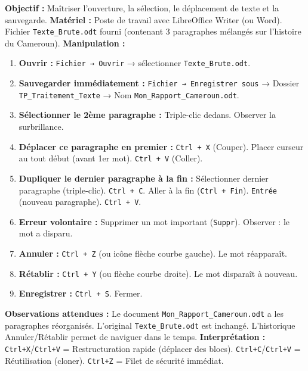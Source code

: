 \documentclass[11pt]{article}
\begin{document}
\begin{experience}
\textbf{Objectif :} Maîtriser l'ouverture, la sélection, le déplacement de texte et la sauvegarde.
\textbf{Matériel :} Poste de travail avec LibreOffice Writer (ou Word). Fichier \texttt{Texte\_Brute.odt} fourni (contenant 3 paragraphes mélangés sur l'histoire du Cameroun).
\textbf{Manipulation :}
\begin{enumerate}
    \item \textbf{Ouvrir :} \texttt{Fichier → Ouvrir} → sélectionner \texttt{Texte\_Brute.odt}.
    \item \textbf{Sauvegarder immédiatement :} \texttt{Fichier → Enregistrer sous} → Dossier \texttt{TP\_Traitement\_Texte} → Nom \texttt{Mon\_Rapport\_Cameroun.odt}.
    \item \textbf{Sélectionner le 2ème paragraphe :} Triple-clic dedans. Observer la surbrillance.
    \item \textbf{Déplacer ce paragraphe en premier :} \texttt{Ctrl + X} (Couper). Placer curseur au tout début (avant 1er mot). \texttt{Ctrl + V} (Coller).
    \item \textbf{Dupliquer le dernier paragraphe à la fin :} Sélectionner dernier paragraphe (triple-clic). \texttt{Ctrl + C}. Aller à la fin (\texttt{Ctrl + Fin}). \texttt{Entrée} (nouveau paragraphe). \texttt{Ctrl + V}.
    \item \textbf{Erreur volontaire :} Supprimer un mot important (\texttt{Suppr}). Observer : le mot a disparu.
    \item \textbf{Annuler :} \texttt{Ctrl + Z} (ou icône flèche courbe gauche). Le mot réapparaît.
    \item \textbf{Rétablir :} \texttt{Ctrl + Y} (ou flèche courbe droite). Le mot disparaît à nouveau.
    \item \textbf{Enregistrer :} \texttt{Ctrl + S}. Fermer.
\end{enumerate}
\textbf{Observations attendues :} Le document \texttt{Mon\_Rapport\_Cameroun.odt} a les paragraphes réorganisés. L'original \texttt{Texte\_Brute.odt} est inchangé. L'historique Annuler/Rétablir permet de naviguer dans le temps.
\textbf{Interprétation :} \texttt{Ctrl+X}/\texttt{Ctrl+V} = Restructuration rapide (déplacer des blocs). \texttt{Ctrl+C}/\texttt{Ctrl+V} = Réutilisation (cloner). \texttt{Ctrl+Z} = Filet de sécurité immédiat.
\end{experience}
\end{document}

